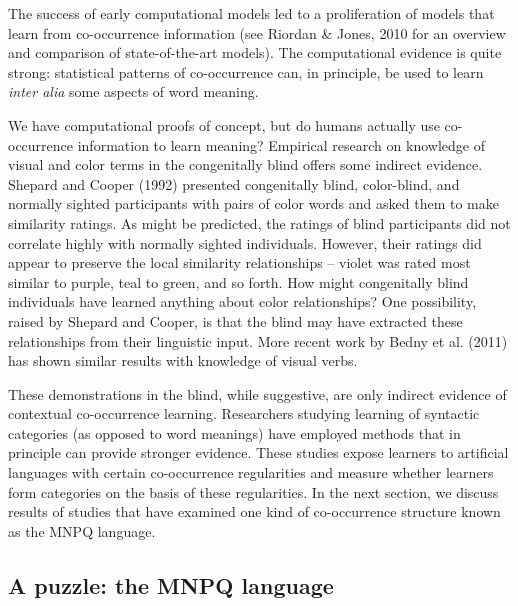 \documentclass[man,floatsintext]{apa6}
\begin{document}
The success of early computational models led to a proliferation of models that learn from co-occurrence information (see Riordan \& Jones, 2010 for an overview and comparison of state-of-the-art models). The computational evidence is quite strong: statistical patterns of co-occurrence can, in principle, be used to learn \emph{inter alia} some aspects of word meaning.

We have computational proofs of concept, but do humans actually use co-occurrence information to learn meaning? Empirical research on knowledge of visual and color terms in the congenitally blind offers some indirect evidence. Shepard and Cooper (1992) presented congenitally blind, color-blind, and normally sighted participants with pairs of color words and asked them to make similarity ratings. As might be predicted, the ratings of blind participants did not correlate highly with normally sighted individuals. However, their ratings did appear to preserve the local similarity relationships -- violet was rated most similar to purple, teal to green, and so forth. How might congenitally blind individuals have learned anything about color relationships? One possibility, raised by Shepard and Cooper, is that the blind may have extracted these relationships from their linguistic input. More recent work by Bedny et al. (2011) has shown similar results with knowledge of visual verbs.

These demonstrations in the blind, while suggestive, are only indirect evidence of contextual co-occurrence learning. Researchers studying learning of syntactic categories (as opposed to word meanings) have employed methods that in principle can provide stronger evidence. These studies expose learners to artificial languages with certain co-occurrence regularities and measure whether learners form categories on the basis of these regularities. In the next section, we discuss results of studies that have examined one kind of co-occurrence structure known as the MNPQ language.

\subsection{A puzzle: the MNPQ language}
\end{document}
